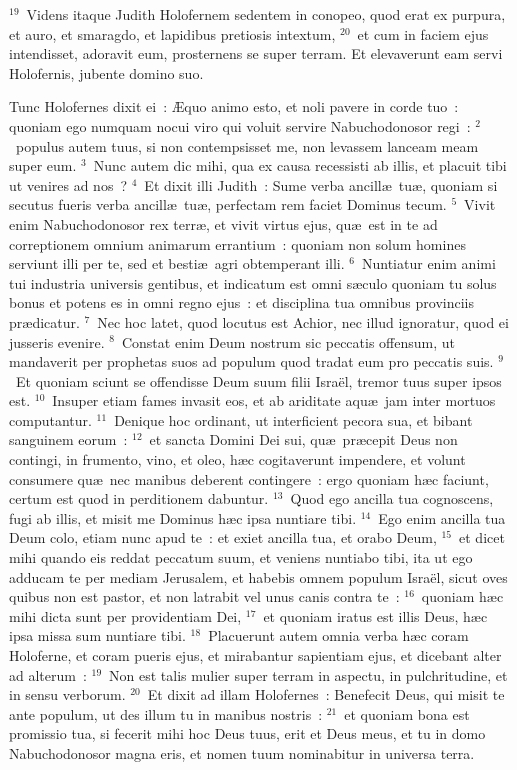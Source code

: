 ${}^{19}$~Videns itaque Judith Holofernem sedentem in conopeo, quod erat ex purpura, et auro, et smaragdo, et lapidibus pretiosis intextum,
${}^{20}$~et cum in faciem ejus intendisset, adoravit eum, prosternens se super terram. Et elevaverunt eam servi Holofernis, jubente domino suo.

\bchapter
\lettrine[lines=3,image=true,loversize=0.05,lraise=-0.03]{T}{}unc Holofernes dixit ei~: \AE quo animo esto, et noli pavere in corde tuo~: quoniam ego numquam nocui viro qui voluit servire Nabuchodonosor regi~:
${}^{2}$~populus autem tuus, si non contempsisset me, non levassem lanceam meam super eum.
${}^{3}$~Nunc autem dic mihi, qua ex causa recessisti ab illis, et placuit tibi ut venires ad nos~?
${}^{4}$~Et dixit illi Judith~: Sume verba ancill\ae\ tu\ae , quoniam si secutus fueris verba ancill\ae\ tu\ae , perfectam rem faciet Dominus tecum.
${}^{5}$~Vivit enim Nabuchodonosor rex terr\ae , et vivit virtus ejus, qu\ae\ est in te ad correptionem omnium animarum errantium~: quoniam non solum homines serviunt illi per te, sed et besti\ae\ agri obtemperant illi.
${}^{6}$~Nuntiatur enim animi tui industria universis gentibus, et indicatum est omni s\ae culo quoniam tu solus bonus et potens es in omni regno ejus~: et disciplina tua omnibus provinciis pr\ae dicatur.
${}^{7}$~Nec hoc latet, quod locutus est Achior, nec illud ignoratur, quod ei jusseris evenire.
${}^{8}$~Constat enim Deum nostrum sic peccatis offensum, ut mandaverit per prophetas suos ad populum quod tradat eum pro peccatis suis.
${}^{9}$~Et quoniam sciunt se offendisse Deum suum filii Isra\"el, tremor tuus super ipsos est.
${}^{10}$~Insuper etiam fames invasit eos, et ab ariditate aqu\ae\ jam inter mortuos computantur.
${}^{11}$~Denique hoc ordinant, ut interficient pecora sua, et bibant sanguinem eorum~:
${}^{12}$~et sancta Domini Dei sui, qu\ae\ pr\ae cepit Deus non contingi, in frumento, vino, et oleo, h\ae c cogitaverunt impendere, et volunt consumere qu\ae\ nec manibus deberent contingere~: ergo quoniam h\ae c faciunt, certum est quod in perditionem dabuntur.
${}^{13}$~Quod ego ancilla tua cognoscens, fugi ab illis, et misit me Dominus h\ae c ipsa nuntiare tibi.
${}^{14}$~Ego enim ancilla tua Deum colo, etiam nunc apud te~: et exiet ancilla tua, et orabo Deum,
${}^{15}$~et dicet mihi quando eis reddat peccatum suum, et veniens nuntiabo tibi, ita ut ego adducam te per mediam Jerusalem, et habebis omnem populum Isra\"el, sicut oves quibus non est pastor, et non latrabit vel unus canis contra te~:
${}^{16}$~quoniam h\ae c mihi dicta sunt per providentiam Dei,
${}^{17}$~et quoniam iratus est illis Deus, h\ae c ipsa missa sum nuntiare tibi.
${}^{18}$~Placuerunt autem omnia verba h\ae c coram Holoferne, et coram pueris ejus, et mirabantur sapientiam ejus, et dicebant alter ad alterum~:
${}^{19}$~Non est talis mulier super terram in aspectu, in pulchritudine, et in sensu verborum.
${}^{20}$~Et dixit ad illam Holofernes~: Benefecit Deus, qui misit te ante populum, ut des illum tu in manibus nostris~:
${}^{21}$~et quoniam bona est promissio tua, si fecerit mihi hoc Deus tuus, erit et Deus meus, et tu in domo Nabuchodonosor magna eris, et nomen tuum nominabitur in universa terra.

